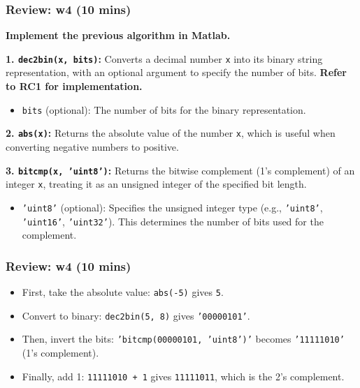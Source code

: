 \documentclass[
	11pt, %
]{beamer}
\begin{document}
\begin{frame}
	\frametitle{Review: w4 (10 mins)}

	\textbf{Implement the previous algorithm in Matlab.}

\vspace{0.3cm}

    \textbf{1. \texttt{dec2bin(x, bits)}:}  
    Converts a decimal number \texttt{x} into its binary string representation, with an optional argument to specify the number of bits. \textbf{Refer to RC1 for implementation.}
    \begin{itemize}
        \item \texttt{bits} (optional): The number of bits for the binary representation.
    \end{itemize}
    
    \vspace{0.3cm}

    \textbf{2. \texttt{abs(x)}:}  
    Returns the absolute value of the number \texttt{x}, which is useful when converting negative numbers to positive.

    \vspace{0.3cm}

    \textbf{3. \texttt{bitcmp(x, 'uint8')}:}  
    Returns the bitwise complement (1's complement) of an integer \texttt{x}, treating it as an unsigned integer of the specified bit length.  
    \begin{itemize}
        \item \texttt{'uint8'} (optional): Specifies the unsigned integer type (e.g., \texttt{'uint8'}, \texttt{'uint16'}, \texttt{'uint32'}). This determines the number of bits used for the complement.
    \end{itemize}


\end{frame}


\begin{frame}
	\frametitle{Review: w4 (10 mins)}

   \begin{itemize}
        \item First, take the absolute value: \texttt{abs(-5)} gives \texttt{5}.
        \item Convert to binary: \texttt{dec2bin(5, 8)} gives \texttt{'00000101'}.
        \item Then, invert the bits: \texttt{'bitcmp(00000101, 'uint8')'} becomes \texttt{'11111010'} (1's complement).
        \item Finally, add 1: \texttt{11111010 + 1} gives \texttt{11111011}, which is the 2's complement.
    \end{itemize}

\end{frame}
\end{document}
